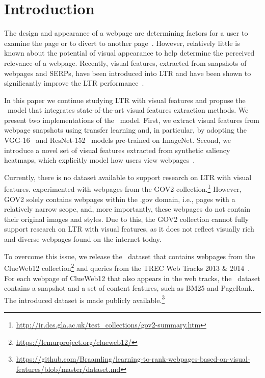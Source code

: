 
\section{Introduction}
The design and appearance of a webpage are determining factors for a user to examine the page or to divert to another page~\cite{nielsen1999designing,nielsen2006f,pernice2017f,wang2014eye}.
However, relatively little is known about the potential of visual appearance to help determine the perceived relevance of a webpage.
Recently, visual features, extracted from snapshots of webpages and \acp{SERP}, have been introduced into \acf{LTR}
and have been shown to significantly improve the \ac{LTR} performance~\cite{fan2017learning,zhang2018relevance}.

In this paper we continue studying \ac{LTR} with visual features and propose the \modelnamef~model
that integrates state-of-the-art visual features extraction methods.
We present two implementations of the \modelname~model.
First, we extract visual features from webpage snapshots using transfer learning and, in particular, by adopting the VGG-16~\cite{simonyan2014very} and ResNet-152~\cite{he2016deep} models pre-trained on ImageNet.
Second, we introduce a novel set of visual features extracted from synthetic saliency heatmaps, which explicitly model how users view webpages~\cite{shan2017two}.

Currently, there is no dataset available to support research on \ac{LTR} with visual features.
\citet{fan2017learning} experimented with webpages from the GOV2 collection.\footnote{\url{http://ir.dcs.gla.ac.uk/test_collections/gov2-summary.htm}}
However, GOV2 solely contains webpages within the .gov domain, i.e., pages with a relatively narrow scope,
and, more importantly, these webpages do not contain their original images and styles.
Due to this, the GOV2 collection cannot fully support research on \ac{LTR} with visual features, as it does not reflect visually rich and diverse webpages found on the internet today.

To overcome this issue, we release the \datasetname~dataset that contains webpages from the ClueWeb12 collection\footnote{\url{https://lemurproject.org/clueweb12/}}
and queries from the TREC Web Tracks 2013 \& 2014~\cite{collins2013trec,collins2015trec}.
For each webpage of ClueWeb12 that also appears in the web tracks, the \datasetname~dataset contains a snapshot
and a set of content features, such as BM25 and PageRank.
The introduced dataset is made publicly available.\footnote{\url{https://github.com/Braamling/learning-to-rank-webpages-based-on-visual-features/blob/master/dataset.md}}

